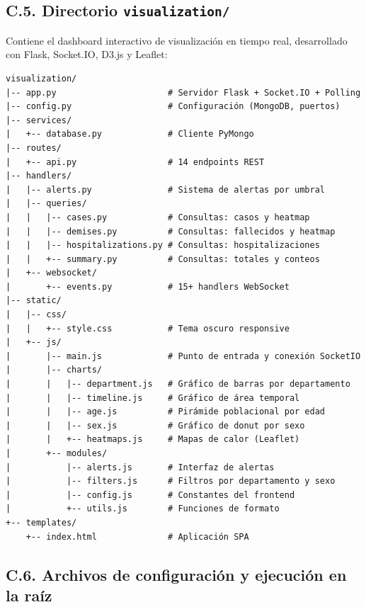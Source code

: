 \documentclass[12pt,a4paper]{article}
\begin{document}
\subsection*{C.5. Directorio \texttt{visualization/}}

Contiene el dashboard interactivo de visualización en tiempo real, desarrollado con Flask, Socket.IO, D3.js y Leaflet:

\begin{verbatim}
visualization/
|-- app.py                      # Servidor Flask + Socket.IO + Polling
|-- config.py                   # Configuración (MongoDB, puertos)
|-- services/
|   +-- database.py             # Cliente PyMongo
|-- routes/
|   +-- api.py                  # 14 endpoints REST
|-- handlers/
|   |-- alerts.py               # Sistema de alertas por umbral
|   |-- queries/
|   |   |-- cases.py            # Consultas: casos y heatmap
|   |   |-- demises.py          # Consultas: fallecidos y heatmap
|   |   |-- hospitalizations.py # Consultas: hospitalizaciones
|   |   +-- summary.py          # Consultas: totales y conteos
|   +-- websocket/
|       +-- events.py           # 15+ handlers WebSocket
|-- static/
|   |-- css/
|   |   +-- style.css           # Tema oscuro responsive
|   +-- js/
|       |-- main.js             # Punto de entrada y conexión SocketIO
|       |-- charts/
|       |   |-- department.js   # Gráfico de barras por departamento
|       |   |-- timeline.js     # Gráfico de área temporal
|       |   |-- age.js          # Pirámide poblacional por edad
|       |   |-- sex.js          # Gráfico de donut por sexo
|       |   +-- heatmaps.js     # Mapas de calor (Leaflet)
|       +-- modules/
|           |-- alerts.js       # Interfaz de alertas
|           |-- filters.js      # Filtros por departamento y sexo
|           |-- config.js       # Constantes del frontend
|           +-- utils.js        # Funciones de formato
+-- templates/
    +-- index.html              # Aplicación SPA
\end{verbatim}

\subsection*{C.6. Archivos de configuración y ejecución en la raíz}
\end{document}
